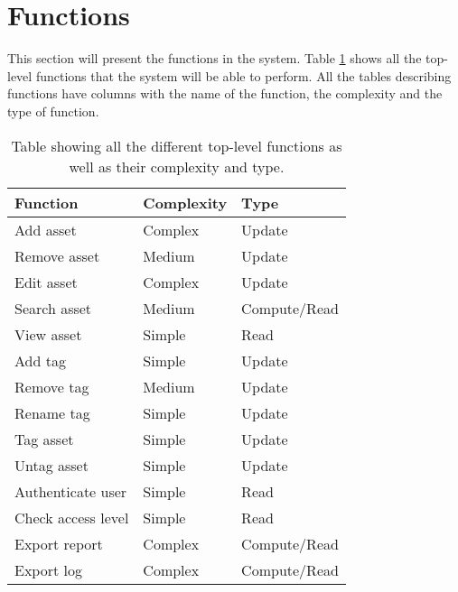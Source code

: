 \section{Functions}\label{sc:functions}

This section will present the functions in the system. Table \ref{tab:functions} shows all the top-level functions that the system will be able to perform. All the tables describing functions have columns with the name of the function, the complexity and the type of function.

\begin{table}[H]
\centering
    \begin{tabular}{|l|l|l|}
        \hline
        \textbf{Function} & \textbf{Complexity} & \textbf{Type} \\
        \hline
        \hline
        Add asset & Complex & Update\\
        \hline
        Remove asset & Medium & Update\\
        \hline
        Edit asset & Complex & Update\\
        \hline
        Search asset & Medium & Compute/Read\\
        \hline
        View asset & Simple & Read\\
        \hline
        Add tag & Simple & Update\\
        \hline
        Remove tag & Medium & Update\\
        \hline
        Rename tag & Simple & Update\\
        \hline
        Tag asset & Simple & Update\\
        \hline
        Untag asset & Simple & Update\\
        \hline
        Authenticate user & Simple & Read\\
        \hline
        Check access level & Simple & Read\\
        \hline
        Export report & Complex & Compute/Read\\
        \hline
        Export log & Complex & Compute/Read\\
        \hline
    
    \end{tabular}
\caption{Table showing all the different top-level functions as well as their complexity and type.}\label{tab:functions}
\end{table}

\par

